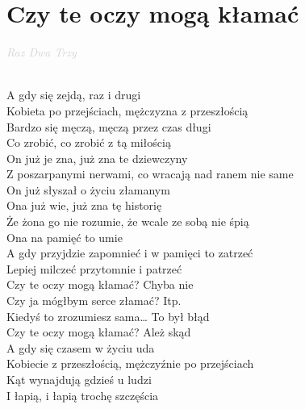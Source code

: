 \documentclass[a5paper, 10pt]{book}
\begin{document}
\newpage
\section{Czy te oczy mogą kłamać}\textcolor{lightgray}{\textit{Raz Dwa Trzy}}\\~\\
\begin{minipage}[t]{0.85\textwidth}
A gdy się zejdą, raz i drugi\\
Kobieta po przejściach, mężczyzna z przeszłością\\
Bardzo się męczą, męczą przez czas długi\\
Co zrobić, co zrobić z tą miłością\\

\hspace*{1mm} On już je zna, już zna te dziewczyny\\
\hspace*{1mm} Z poszarpanymi nerwami, co wracają nad ranem nie same\\
\hspace*{1mm} On już słyszał o życiu złamanym\\

\hspace*{1mm} Ona już wie, już zna tę historię\\
\hspace*{1mm} Że żona go nie rozumie, że wcale ze sobą nie śpią\\
\hspace*{1mm} Ona na pamięć to umie\\

\hspace*{4mm} A gdy przyjdzie zapomnieć i w pamięci to zatrzeć\\
\hspace*{4mm} Lepiej milczeć przytomnie i patrzeć\\
\hspace*{6mm} Czy te oczy mogą kłamać? Chyba nie\\
\hspace*{6mm} Czy ja mógłbym serce złamać? Itp.\\
\hspace*{6mm} Kiedyś to zrozumiesz sama… To był błąd\\
\hspace*{6mm} Czy te oczy mogą kłamać? Ależ skąd\\

A gdy się czasem w życiu uda\\
Kobiecie z przeszłością, mężczyźnie po przejściach\\
Kąt wynajdują gdzieś u ludzi\\
I łapią, i łapią trochę szczęścia\\


\end{minipage}
\end{document}

